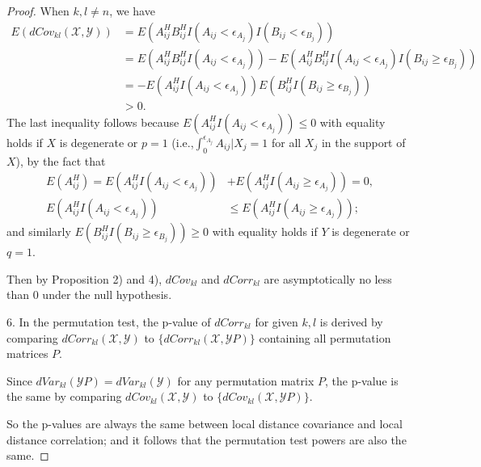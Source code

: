 \documentclass[12pt]{article}
\newtheorem{lem}{Lemma}
\begin{document}
\begin{proof}
When $k,l \neq n$, we have 
\begin{align*}
E(dCov_{kl}(\mathcal{X},\mathcal{Y})) &= E(A^{H}_{ij}B^{H}_{ij}I(A_{ij}< \epsilon_{A_{j}})I(B_{ij}< \epsilon_{B_{j}})) \\
&=E(A^{H}_{ij}B^{H}_{ij}I(A_{ij}< \epsilon_{A_{j}}))-E(A^{H}_{ij}B^{H}_{ij}I(A_{ij}< \epsilon_{A_{j}})I(B_{ij} \geq \epsilon_{B_{j}})) \\
&=-E(A^{H}_{ij}I(A_{ij}< \epsilon_{A_{j}}))E(B^{H}_{ij}I(B_{ij} \geq \epsilon_{B_{j}})) \\
&> 0.
\end{align*}
The last inequality follows because $E(A^{H}_{ij}I(A_{ij}< \epsilon_{A_{j}})) \leq 0$ with equality holds if $X$ is degenerate or $p=1$ (i.e.,$\int_{0}^{\epsilon_{A_{j}}}A_{ij} | X_{j}=1$ for all $X_{j}$ in the support of $X$), by the fact that 
\begin{align*}
E(A^{H}_{ij})=E(A^{H}_{ij}I(A_{ij}< \epsilon_{A_{j}})) &+ E(A^{H}_{ij}I(A_{ij}\geq \epsilon_{A_{j}}))=0,\\
E(A^{H}_{ij}I(A_{ij}< \epsilon_{A_{j}})) &\leq E(A^{H}_{ij}I(A_{ij}\geq \epsilon_{A_{j}}));
\end{align*} 
and similarly $E(B^{H}_{ij}I(B_{ij} \geq \epsilon_{B_{j}})) \geq 0$ with equality holds if $Y$ is degenerate or $q=1$.

Then by Proposition 2) and 4), $dCov_{kl}$ and $dCorr_{kl}$ are asymptotically no less than $0$ under the null hypothesis.

6. In the permutation test, the p-value of $dCorr_{kl}$ for given $k,l$ is derived by comparing $dCorr_{kl}(\mathcal{X},\mathcal{Y})$ to $\{dCorr_{kl}(\mathcal{X},\mathcal{Y}P)\}$ containing all permutation matrices $P$. 

Since $dVar_{kl}(\mathcal{Y}P)=dVar_{kl}(\mathcal{Y})$ for any permutation matrix $P$, the p-value is the same by comparing $dCov_{kl}(\mathcal{X},\mathcal{Y})$ to $\{dCov_{kl}(\mathcal{X},\mathcal{Y}P)\}$. 

So the p-values are always the same between local distance covariance and local distance correlation; and it follows that the permutation test powers are also the same.
\end{proof}


\end{document}
